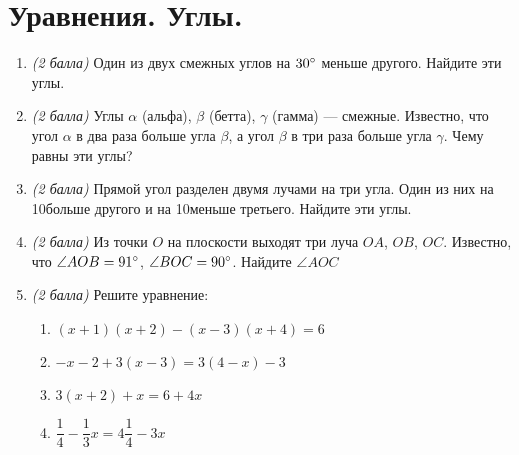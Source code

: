 \documentclass[12pt, a4paper]{article}
\begin{document}
		

\section*{Уравнения. Углы.}
\begin{enumerate}
	\item \textit{(2 балла)} Один из двух смежных углов на $30\degree$ меньше другого. Найдите эти углы.
	\item \textit{(2 балла)} Углы $\alpha$ (альфа), $\beta$ (бетта), $\gamma$ (гамма) — смежные. Известно, что угол $\alpha$ в два раза больше угла $\beta$, а угол $\beta$ в три раза больше угла $\gamma$. Чему равны эти углы?
	\item \textit{(2 балла)} Прямой угол разделен двумя лучами на три угла. Один из них на 10\degree больше другого и на 10\degree меньше третьего. Найдите эти углы.
	\item \textit{(2 балла)} Из точки $O$ на плоскости выходят три луча $OA$, $OB$, $OC$. Известно, что $\angle AOB=91\degree$, $\angle BOC=90\degree$. Найдите $\angle AOC$
	\item \textit{(2 балла)} Решите уравнение:
	\begin{enumerate}[label=\asbuk*)]
		\item $(x+1)(x+2)-(x-3)(x+4)=6$
		\item $-x - 2 + 3(x-3) = 3(4 - x) - 3$
		\item $3(x+ 2) + x = 6 + 4x$
		\item $\dfrac{1}{4} - \dfrac{1}{3}x = 4\dfrac{1}{4} - 3x$
	\end{enumerate}
\end{enumerate}
\end{document}
